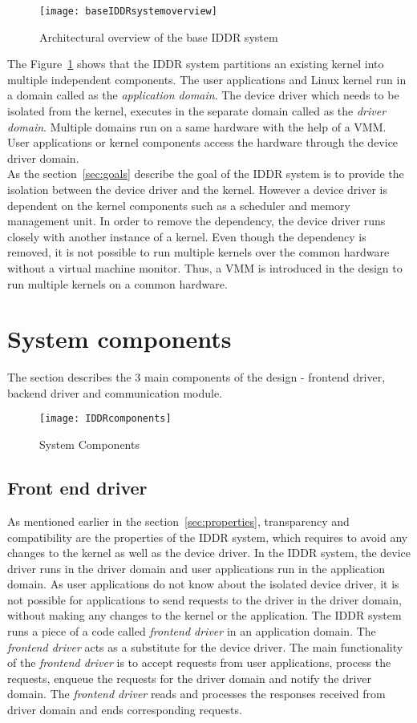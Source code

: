 \begin{figure}[!ht]
\centering
\texttt{[image: baseIDDRsystemoverview]}
\caption{Architectural overview of the base IDDR system}
\label{fig:base IDDR system overview}
\end{figure}
The Figure~\ref{fig:base IDDR system overview} shows that the IDDR system partitions an existing kernel into multiple independent components. The user applications and Linux kernel run in a domain called as the \textit{application domain}. The device driver which needs to be isolated from the kernel, executes in the separate domain called as the \textit{driver domain}. Multiple domains run on a same hardware with the help of a VMM. User applications or kernel components access the hardware through the device driver domain.
\\[3mm]
As the section~\ref{sec:goals} describe the goal of the IDDR system is to provide the isolation between the device driver and the kernel. However a device driver is dependent on the kernel components such as a scheduler and memory management unit. In order to remove the dependency, the device driver runs closely with another instance of a kernel. Even though the dependency is removed, it is not possible to run multiple kernels over the common hardware without a virtual machine monitor. Thus, a VMM is introduced in the design to run multiple kernels on a common hardware. 

\section{System components}\label{components}
The section describes the 3 main components of the design - frontend driver, backend driver and communication module.
\begin{figure}[!ht]
\centering
\texttt{[image: IDDRcomponents]}
\caption{System Components}
\label{fig:Design Evo1}
\end{figure}

\subsection{Front end driver}
\label{subsec:frontend}
As mentioned earlier in the section~\ref{sec:properties}, transparency and compatibility are the properties of the IDDR system, which requires to avoid any changes to the kernel as well as the device driver. In the IDDR system, the device driver runs in the driver domain and user applications run in the application domain. As user applications do not know about the isolated device driver, it is not possible for applications to send requests to the driver in the driver domain, without making any changes to the kernel or the application. The IDDR system runs a piece of a code called \textit{frontend driver} in an application domain. The \textit{frontend driver} acts as a substitute for the device driver. The main functionality of the \textit{frontend driver} is to accept requests from user applications, process the requests, enqueue the requests for the driver domain and notify the driver domain. The \textit{frontend driver} reads and processes the responses received from driver domain and ends corresponding requests.

